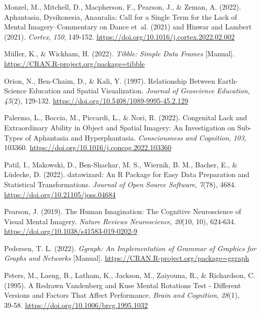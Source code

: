 \documentclass[
  12pt,
]{article}
\newlength{\cslhangindent}
\newlength{\cslentryspacingunit} %
\newenvironment{CSLReferences}[2] %
 {%
  \setlength{\parindent}{0pt}
  \ifodd #1
  \let\oldpar\par
  \def\par{\hangindent=\cslhangindent\oldpar}
  \fi
  \setlength{\parskip}{#2\cslentryspacingunit}
 }%
 {}
\begin{document}
\begin{CSLReferences}{1}{0}
\leavevmode{}%
Monzel, M., Mitchell, D., Macpherson, F., Pearson, J., \& Zeman, A.
(2022). Aphantasia, Dysikonesia, Anauralia: Call for a Single Term for
the Lack of Mental Imagery--{Commentary} on {Dance} et~al. (2021) and
{Hinwar} and {Lambert} (2021). \emph{Cortex}, \emph{150}, 149‑152.
\url{https://doi.org/10.1016/j.cortex.2022.02.002}

\leavevmode{}%
Müller, K., \& Wickham, H. (2022). \emph{Tibble: {Simple} Data Frames}
{[}Manual{]}. \url{https://CRAN.R-project.org/package=tibble}

\leavevmode{}%
Orion, N., Ben-Chaim, D., \& Kali, Y. (1997). Relationship {Between
Earth-Science Education} and {Spatial Visualization}. \emph{Journal of
Geoscience Education}, \emph{45}(2), 129‑132.
\url{https://doi.org/10.5408/1089-9995-45.2.129}

\leavevmode{}%
Palermo, L., Boccia, M., Piccardi, L., \& Nori, R. (2022). Congenital
Lack and Extraordinary Ability in Object and Spatial Imagery: {An}
Investigation on Sub-Types of Aphantasia and Hyperphantasia.
\emph{Consciousness and Cognition}, \emph{103}, 103360.
\url{https://doi.org/10.1016/j.concog.2022.103360}

\leavevmode{}%
Patil, I., Makowski, D., Ben-Shachar, M. S., Wiernik, B. M., Bacher, E.,
\& Lüdecke, D. (2022). {datawizard}: {An R} Package for Easy Data
Preparation and Statistical Transformations. \emph{Journal of Open
Source Software}, \emph{7}(78), 4684.
\url{https://doi.org/10.21105/joss.04684}

\leavevmode{}%
Pearson, J. (2019). The Human Imagination: The Cognitive Neuroscience of
Visual Mental Imagery. \emph{Nature Reviews Neuroscience}, \emph{20}(10,
10), 624‑634. \url{https://doi.org/10.1038/s41583-019-0202-9}

\leavevmode{}%
Pedersen, T. L. (2022). \emph{Ggraph: {An} Implementation of Grammar of
Graphics for Graphs and Networks} {[}Manual{]}.
\url{https://CRAN.R-project.org/package=ggraph}

\leavevmode{}%
Peters, M., Laeng, B., Latham, K., Jackson, M., Zaiyouna, R., \&
Richardson, C. (1995). A {Redrawn Vandenberg} and {Kuse Mental Rotations
Test} - {Different Versions} and {Factors That Affect Performance}.
\emph{Brain and Cognition}, \emph{28}(1), 39‑58.
\url{https://doi.org/10.1006/brcg.1995.1032}


\end{CSLReferences}
\end{document}
